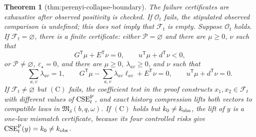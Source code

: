 \documentclass{article}
\newtheorem{theorem}{Theorem}
\begin{document}
\begin{theorem}[thm:perenyi-collapse-boundary]
The failure certificates are exhaustive after observed positivity is checked.  If \(\mathcal O_t\) fails, the stipulated observed comparison is undefined; this does not imply that \(\mathcal F_t\) is empty.  Suppose \(\mathcal O_t\) holds.  If \(\mathcal F_t=\varnothing\), there is a finite certificate: either \(\mathcal P=\varnothing\) and there are \(\mu\geq0\), \(\nu\) such that
\[
 G^{\mathsf T}\mu+E^{\mathsf T}\nu=0,
 \qquad u^{\mathsf T}\mu+d^{\mathsf T}\nu<0,
\]
or \(\mathcal P\neq\varnothing\), \(\varepsilon_\star=0\), and there are \(\mu\geq0\), \(\lambda_{av}\geq0\), and \(\nu\) such that
\[
 \sum_{a,v}\lambda_{av}=1,\qquad
 G^{\mathsf T}\mu-\sum_{a,v}\lambda_{av}\ell_{av}
       +E^{\mathsf T}\nu=0,\qquad
 u^{\mathsf T}\mu+d^{\mathsf T}\nu=0.
\]
If \(\mathcal F_t\neq\varnothing\) but \((\mathrm C)\) fails, the coefficient test in the proof constructs \(x_1,x_2\in\mathcal F_t\) with different values of \(\operatorname{CSE}^{\rm P}_t\), and exact history compression lifts both vectors to compatible laws in \(\mathfrak M_\delta(b,q,\omega)\).  If \((\mathrm C)\) holds but \(k_0\neq k_{\rm obs}\), the lift of \(y\) is a one-law mismatch certificate, because its four controlled risks give \(\operatorname{CSE}^{\rm P}_t(y)=k_0\neq k_{\rm obs}\).
\end{theorem}
\end{document}
